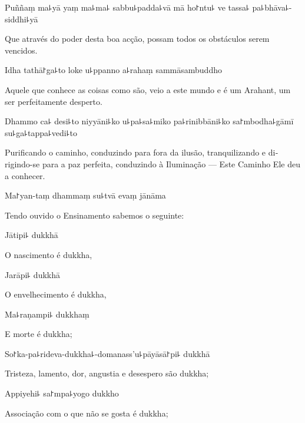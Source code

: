 Puññaṃ ma꜕yā yaṃ ma꜕ma꜕ sabbu꜕padda꜕vā mā ho꜓ntu꜕ ve tassa꜕ pa꜕bhāva꜕-siddhi꜕yā

\begin{english}
  Que através do poder desta boa acção, possam todos os obstáculos serem vencidos.
\end{english}

Idha tathā꜓ga꜕to loke u꜕ppanno a꜕rahaṃ sammāsambuddho

\begin{english}
  Aquele que conhece as coisas como são, veio a este mundo e é um Arahant, um ser perfeitamente desperto.
\end{english}

Dhammo ca꜕ desi꜕to niyyāni꜕ko u꜕pa꜕sa꜕miko pa꜕rinibbāni꜕ko sa꜓mbodha꜕gāmī su꜕ga꜕tappa꜕vedi꜕to

\begin{english}
  Purificando o caminho, conduzindo para fora da ilusão, tranquilizando e dirigindo-se para a paz perfeita, conduzindo à Iluminação  --- Este Caminho Ele deu a conhecer.
\end{english}

Ma꜓yan-taṃ dhammaṃ su꜕tvā evaṃ jānāma

\begin{english}
  Tendo ouvido o Ensinamento sabemos o seguinte:
\end{english}

Jātipi꜕ dukkhā

\begin{english}
  O nascimento é dukkha,
\end{english}

Jarāpi꜕ dukkhā

\begin{english}
  O envelhecimento é dukkha,
\end{english}

Ma꜕raṇampi꜕ dukkhaṃ

\begin{english}
  E morte é dukkha;
\end{english}

So꜓ka-pa꜕rideva-dukkha꜕-domanass'u꜕pāyāsā꜓pi꜕ dukkhā

\begin{english}
  Tristeza, lamento, dor, angustia e desespero são dukkha;
\end{english}

Appiyehi꜕ sa꜓mpa꜕yogo dukkho

\begin{english}
  Associação com o que não se gosta é dukkha;
\end{english}

